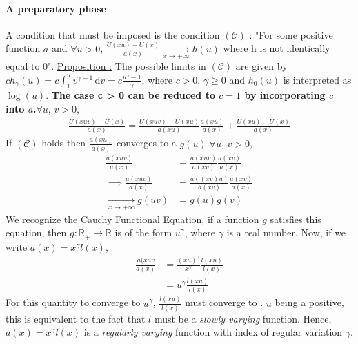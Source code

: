 \paragraph{A preparatory phase} A condition that must be imposed is the condition $(\mathcal{C})$ : "For some positive function $a$ and $\forall u > 0$, $\frac{U(x u) - U(x)}{a(x)} \xrightarrow[x \rightarrow + \infty]{} h(u)$ where h is not identically equal to 0". \newline
\underline{Proposition :} The possible limits in $(\mathcal{C})$ are given by $c h_\gamma(u) = c \int_1^u \! v^{\gamma -1}\, \mathrm{d}v = c \frac{u^\gamma -1}{\gamma}$, where $c > 0$, $\gamma \ge 0$ and $h_0(u)$ is interpreted as $\log(u)$. \newline \textbf{The case c > 0 can be reduced to $c = 1$ by incorporating $c$ into $a$.}\newline $\forall u$, $v > 0$, \newline
\begin{equation}
\begin{alignat*}{2}
\frac{U(x u v) - U(x)}{a(x)} = \frac{U(x u v) - U(x u)}{a(x u)} \frac{a(x u)}{a(x)} + \frac{U(x u) - U(x)}{a(x)}
\end{alignat*}
\end{equation}\newline If $(\mathcal{C})$ holds then $\frac{a(x u)}{a(x)}$ converges to a $g(u)$.\newline $\forall u$, $v > 0$,
\begin{equation}
\begin{alignat*}{2}
\frac{a(x u v)}{a(x)} &= \frac{a(x u v)}{a(x v)} \frac{a(x v)}{a(x)}\\
\implies \frac{a(x u v)}{a(x)} &= \frac{a((x v) u )}{a(x v)} \frac{a(x v)}{a(x)}\\
\xrightarrow[x \rightarrow + \infty]{} g(u v)  &= g(u) g(v)
\end{alignat*}
\end{equation}\newline We recognize the Cauchy Functional Equation, if a function $g$ satisfies this equation, then $g : \mathbb{R}_+ \longrightarrow \mathbb{R}$ is of the form $u^\gamma$, where $\gamma$ is a real number. Now, if we write $a(x) = x^\gamma l(x)$, \newline
\begin{equation}
\begin{alignat*}{2}
\frac{a(x u v}{a(x)} &= \frac{(x u)^\gamma}{x^\gamma} \frac{l(x u)}{l(x)} \\
&= u^\gamma \frac{l(x u)}{l(x)}
\end{alignat*}
\end{equation} \newline For this quantity to converge to $u^\gamma$, $\frac{l(x u)}{l(x)}$ must converge to . $u$ being a positive, this is equivalent to the fact that $l$ must be a \textit{slowly varying} function. Hence, $a(x) = x^\gamma l(x)$ is a \textit{regularly varying} function with index of regular variation $\gamma$.\newline
